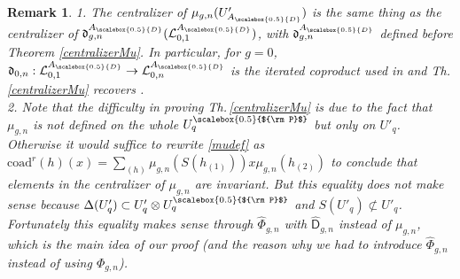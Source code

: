 \documentclass[11pt]{amsart}
\newtheorem{remark}[teo]{Remark}
\newcommand{\AD}{A_{\scalebox{0.5}{D}}}
\newcommand{\Pup}{{\scalebox{0.5}{${\rm P}$}}}
\begin{document}
\begin{remark}
{\rm 1. The centralizer of $\mu_{g,n}(U_{\AD}')$ is the same thing as the centralizer of $\mathfrak{d}_{g,n}^{\AD}(\mathcal{L}_{0,1}^{\AD})$, with $\mathfrak{d}_{g,n}^{\AD}$ defined before Theorem \ref{centralizerMu}. In particular, for $g=0$, $\mathfrak{d}_{0,n} : \mathcal{L}_{0,1}^{\AD} \to \mathcal{L}_{0,n}^{\AD}$ is the iterated coproduct used in \cite[\S 6.5]{BR1} and Th.\,\ref{centralizerMu} recovers \cite[Prop.\,6.19]{BR1}.
\\2. Note that the difficulty in proving Th.\,\ref{centralizerMu} is due to the fact that $\mu_{g,n}$ is not defined on the whole $U_q^\Pup$ but only on $U'_q$. Otherwise it would suffice to rewrite \eqref{mudef} as $\mathrm{coad}^r(h)(x) = \textstyle \sum_{(h)} \mu_{g,n}(S(h_{(1)}))x\mu_{g,n}(h_{(2)})$ to conclude that elements in the centralizer of $\mu_{g,n}$ are invariant. But this equality does not make sense because $\Delta(U_q') \subset U_q' \otimes U_q^\Pup$ and $S(U'_q) \not\subset U'_q$. Fortunately this equality makes sense through $\widehat{\Phi}_{g,n}$ with $\widehat{\mathsf{D}}_{g,n}$ instead of $\mu_{g,n}$, which is the main idea of our proof (and the reason why we had to introduce $\widehat{\Phi}_{g,n}$ instead of using $\Phi_{g,n}$).}
\end{remark}
\end{document}
